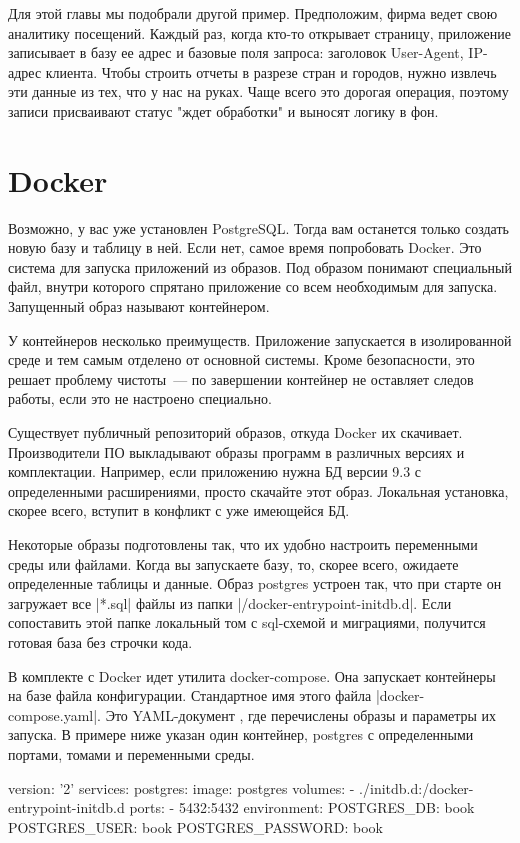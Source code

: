 Для этой главы мы подобрали другой пример. Предположим, фирма ведет свою
аналитику посещений. Каждый раз, когда кто-то открывает страницу, приложение
записывает в базу ее адрес и базовые поля запроса: заголовок User-Agent,
IP-адрес клиента. Чтобы строить отчеты в разрезе стран и городов, нужно извлечь
эти данные из тех, что у нас на руках. Чаще всего это дорогая операция, поэтому
записи присваивают статус "ждет обработки" и выносят логику в фон.

\section{Docker}

Возможно, у вас уже установлен PostgreSQL. Тогда вам останется только создать
новую базу и таблицу в ней. Если нет, самое время попробовать Docker. Это
система для запуска приложений из образов. Под образом понимают специальный
файл, внутри которого спрятано приложение со всем необходимым для
запуска. Запущенный образ называют контейнером.

У контейнеров несколько преимуществ. Приложение запускается в изолированной
среде и тем самым отделено от основной системы. Кроме безопасности, это решает
проблему чистоты~--- по завершении контейнер не оставляет следов работы, если это
не настроено специально.

Существует публичный репозиторий образов, откуда Docker их
скачивает. Производители ПО выкладывают образы программ в различных версиях и
комплектации. Например, если приложению нужна БД версии 9.3 с определенными
расширениями, просто скачайте этот образ. Локальная установка, скорее всего,
вступит в конфликт с уже имеющейся БД.

Некоторые образы подготовлены так, что их удобно настроить переменными среды или
файлами. Когда вы запускаете базу, то, скорее всего, ожидаете определенные
таблицы и данные. Образ postgres устроен так, что при старте он загружает все
\spverb|*.sql| файлы из папки \spverb|/docker-entrypoint-initdb.d|. Если сопоставить этой
папке локальный том с sql-схемой и миграциями, получится готовая база без
строчки кода.

В комплекте с Docker идет утилита docker-compose. Она запускает контейнеры на
базе файла конфигурации. Стандартное имя этого файла \spverb|docker-compose.yaml|. Это
YAML-документ , где перечислены образы и параметры их запуска. В примере ниже
указан один контейнер, postgres с определенными портами, томами и переменными
среды.

\begin{code}
version: '2'
services:
  postgres:
    image: postgres
    volumes:
      - ./initdb.d:/docker-entrypoint-initdb.d
    ports:
      - 5432:5432
    environment:
      POSTGRES_DB: book
      POSTGRES_USER: book
      POSTGRES_PASSWORD: book
\end{code}

